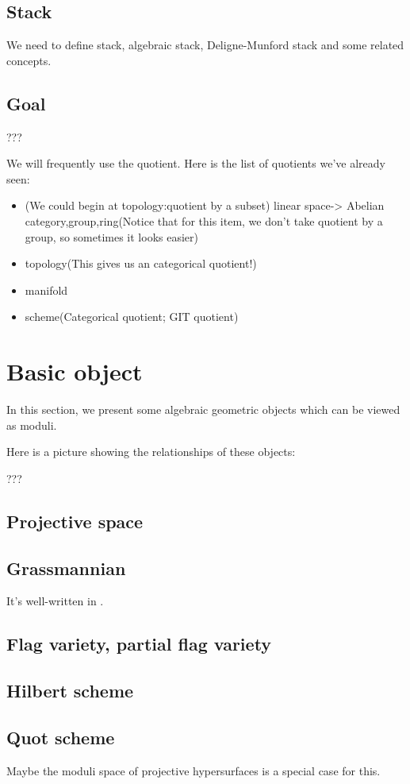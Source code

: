 \documentclass[reqno,11pt]{amsart}
\numberwithin{equation}{section}
\theoremstyle{plain}
\theoremstyle{plain}
\numberwithin{equation}{section}
\theoremstyle{remark}
\begin{document}
\subsection{Stack}
We need to define stack, algebraic stack, Deligne-Munford stack and some related concepts.
\subsection{Goal}
???

We will frequently use the quotient. Here is the list of quotients we've already seen:
\begin{itemize}
\item (We could begin at topology:quotient by a subset) linear space-> Abelian category,group,ring(Notice that for this item, we don't take quotient by a group, so sometimes it looks easier)
\item topology(This gives us an categorical quotient!)
\item manifold
\item scheme(Categorical quotient; GIT quotient)
\end{itemize}
\section{Basic object}
In this section, we present some algebraic geometric objects which can be viewed as moduli.

Here is a picture showing the relationships of these objects:

???
\subsection{Projective space}
\subsection{Grassmannian}
It's well-written in \cite[16.7]{FOAG}.
\subsection{Flag variety, partial flag variety}
\subsection{Hilbert scheme}
\subsection{Quot scheme}
Maybe the moduli space of projective hypersurfaces is a special case for this.
\end{document}
